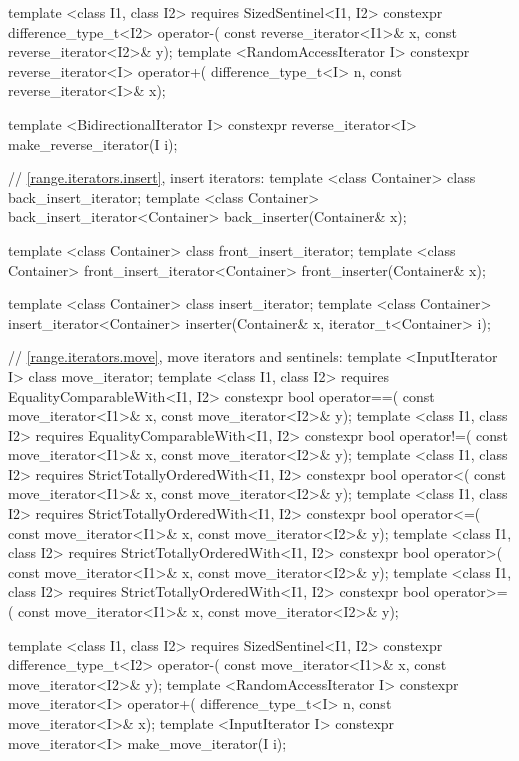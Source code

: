 {\begin{codeblock}
{{    template <class I1, class I2>
        requires SizedSentinel<I1, I2>
      constexpr difference_type_t<I2> operator-(
        const reverse_iterator<I1>& x,
        const reverse_iterator<I2>& y);
    template <RandomAccessIterator I>
      constexpr reverse_iterator<I> operator+(
        difference_type_t<I> n,
        const reverse_iterator<I>& x);

    template <BidirectionalIterator I>
      constexpr reverse_iterator<I> make_reverse_iterator(I i);

    // \ref{range.iterators.insert}, insert iterators:
    template <class Container> class back_insert_iterator;
    template <class Container>
      back_insert_iterator<Container> back_inserter(Container& x);

    template <class Container> class front_insert_iterator;
    template <class Container>
      front_insert_iterator<Container> front_inserter(Container& x);

    template <class Container> class insert_iterator;
    template <class Container>
      insert_iterator<Container> inserter(Container& x, iterator_t<Container> i);

    // \ref{range.iterators.move}, move iterators and sentinels:
    template <InputIterator I> class move_iterator;
    template <class I1, class I2>
        requires EqualityComparableWith<I1, I2>
      constexpr bool operator==(
        const move_iterator<I1>& x, const move_iterator<I2>& y);
    template <class I1, class I2>
        requires EqualityComparableWith<I1, I2>
      constexpr bool operator!=(
        const move_iterator<I1>& x, const move_iterator<I2>& y);
    template <class I1, class I2>
        requires StrictTotallyOrderedWith<I1, I2>
      constexpr bool operator<(
        const move_iterator<I1>& x, const move_iterator<I2>& y);
    template <class I1, class I2>
        requires StrictTotallyOrderedWith<I1, I2>
      constexpr bool operator<=(
        const move_iterator<I1>& x, const move_iterator<I2>& y);
    template <class I1, class I2>
        requires StrictTotallyOrderedWith<I1, I2>
      constexpr bool operator>(
        const move_iterator<I1>& x, const move_iterator<I2>& y);
    template <class I1, class I2>
        requires StrictTotallyOrderedWith<I1, I2>
      constexpr bool operator>=(
        const move_iterator<I1>& x, const move_iterator<I2>& y);

    template <class I1, class I2>
        requires SizedSentinel<I1, I2>
      constexpr difference_type_t<I2> operator-(
        const move_iterator<I1>& x,
        const move_iterator<I2>& y);
    template <RandomAccessIterator I>
      constexpr move_iterator<I> operator+(
        difference_type_t<I> n,
        const move_iterator<I>& x);
    template <InputIterator I>
      constexpr move_iterator<I> make_move_iterator(I i);

}}
\end{codeblock}}
